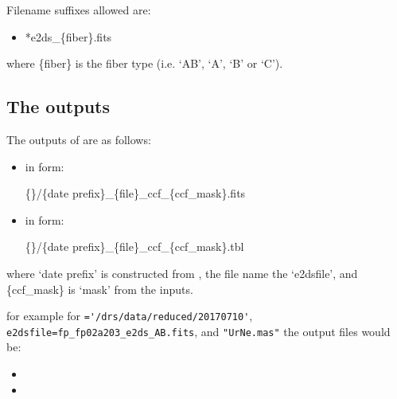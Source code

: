 \noindent Filename suffixes allowed are:
\begin{itemize}
	\item *e2ds\_\{fiber\}.fits
\end{itemize}
\noindent where \{fiber\} is the fiber type (i.e. `AB', `A', `B' or `C').

\subsection{The outputs}
The outputs of \calCCF are as follows:

\begin{itemize}

\item {} in form:
\begin{tcustomdir}
\{\reduceddir\}/\{date prefix\}\_\{file\}\_ccf\_\{ccf\_mask\}.fits
\end{tcustomdir}

\item {} in form:
\begin{tcustomdir}
\{\reduceddir\}/\{date prefix\}\_\{file\}\_ccf\_\{ccf\_mask\}.tbl
\end{tcustomdir}

\end{itemize}


\noindent where `date prefix' is constructed from \argnightname , the file name the `e2dsfile', and \{ccf\_mask\} is `mask' from the inputs.


\noindent for example for \reduceddir\lstinline[style=pythoninline]|='/drs/data/reduced/20170710'|, \lstinline[style=pythoninline]|e2dsfile=fp_fp02a203_e2ds_AB.fits|, and \lstinline[style=pythoninline]|"UrNe.mas"| the output files would be:
\begin{tcustomdir}
\begin{itemize}
\item {}
\item {}
\end{itemize}
\end{tcustomdir}

